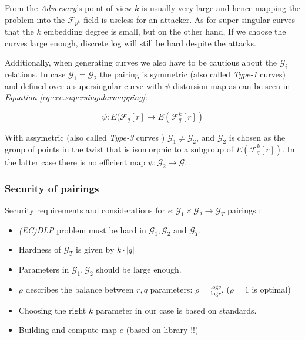 From the \textit{Adversary}'s point of view $k$ is usually very large and hence mapping
the problem into the $\mathcal{F}_{p^k}$ ﬁeld is useless for an attacker.
As for super-singular curves that the $k$ embedding degree
is small, but on the other hand, If we choose the curves large enough,
discrete log will still be hard despite the attacks.\cite{crypto.ivan.cryptology}

Additionally, when generating curves we also have to be cautious about the $\mathcal{G}_i$ relations.
In case $\mathcal{G}_1 = \mathcal{G}_2$ the pairing is symmetric (also called \textit{Type-1} curves)
and defined over a supersingular curve with $\psi$ distorsion map
as can be seen in \textit{Equation \ref{eq:ecc.supersingularmapping}}\cite{ecc.fam.param}:

\begin{equation}
    \label{eq:ecc.supersingularmapping}
        \psi : E(\mathcal{F}_q[r] \rightarrow E(\mathcal{F}_q^k[r])
\end{equation}

With assymetric (also called \textit{Type-3} curves )
$\mathcal{G}_1 \neq \mathcal{G}_2$, and $\mathcal{G}_2$ is chosen
as the group of points in the twist that is isomorphic to a subgroup
of $E(\mathcal{F}_q^k[r])$. In the latter case there is no efficient
map $\psi : \mathcal{G}_2 \rightarrow \mathcal{G}_1$. \cite{ecc.fam.param}

\subsubsection{Security of pairings}
\label{ssec:apx.ecc.curves.pairings.security}


Security requirements and considerations for $e: \mathcal{G}_1 \times \mathcal{G}_2 \rightarrow \mathcal{G}_T$ pairings \cite{ecc.fam.param}:

\begin{itemize}
    \item \textit{(EC)DLP} problem must be hard in $\mathcal{G}_1, \mathcal{G}_2$ and $\mathcal{G}_T$.
    \item Hardness of $\mathcal{G}_T$ is given by $k \cdot \lvert q \rvert$
    \item Parameters in $\mathcal{G}_1, \mathcal{G}_2$ should be large enough.
    \item $\rho$ describes the balance between $r,q$ parameters: $\rho = \frac{\mathrm{log} q}{\mathrm{log} r}$. ($\rho = 1$ is optimal)
    \item Choosing the right $k$ parameter in our case is based on standards.
    \item Building and compute map $e$ (based on library !!)
\end{itemize}

